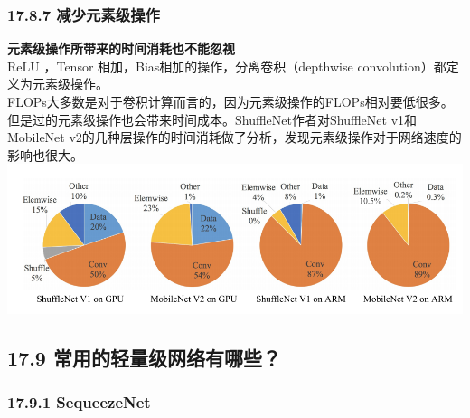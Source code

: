\subsubsection{17.8.7
减少元素级操作}\label{ux51cfux5c11ux5143ux7d20ux7ea7ux64cdux4f5c}

\textbf{元素级操作所带来的时间消耗也不能忽视}\\
ReLU ，Tensor 相加，Bias相加的操作，分离卷积（depthwise
convolution）都定义为元素级操作。\\
FLOPs大多数是对于卷积计算而言的，因为元素级操作的FLOPs相对要低很多。但是过的元素级操作也会带来时间成本。ShuffleNet作者对ShuffleNet
v1和MobileNet
v2的几种层操作的时间消耗做了分析，发现元素级操作对于网络速度的影响也很大。
\includegraphics{./img/ch17/8.png}

\subsection{17.9
常用的轻量级网络有哪些？}\label{ux5e38ux7528ux7684ux8f7bux91cfux7ea7ux7f51ux7edcux6709ux54eaux4e9b}

\subsubsection{17.9.1 SequeezeNet}\label{sequeezenet}

